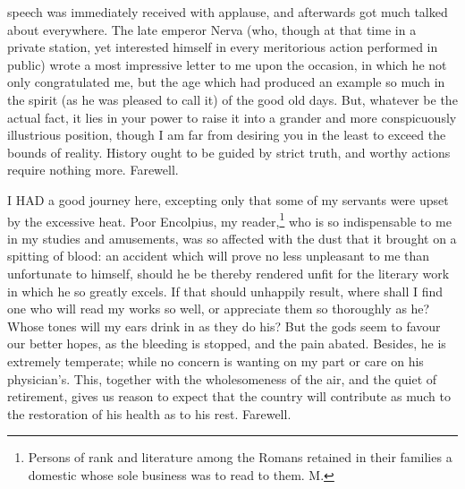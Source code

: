 speech was immediately received with applause, and afterwards got much
talked about everywhere. The late emperor Nerva (who, though at that time
in a private station, yet interested himself in every meritorious action
performed in public) wrote a most impressive letter to me upon the
occasion, in which he not only congratulated me, but the age which had
produced an example so much in the spirit (as he was pleased to call it)
of the good old days. But, whatever be the actual fact, it lies in your
power to raise it into a grander and more conspicuously illustrious
position, though I am far from desiring you in the least to exceed the
bounds of reality. History ought to be guided by strict truth, and worthy
actions require nothing more. Farewell.


I HAD a good journey here, excepting only that some of my servants were
upset by the excessive heat. Poor Encolpius, my reader,\footnote{Persons of rank and
literature among the Romans retained in their families a domestic whose
sole business was to read to them. M.}
who is so indispensable to me in my studies and amusements, was so
affected with the dust that it brought on a spitting of blood: an accident
which will prove no less unpleasant to me than unfortunate to himself,
should he be thereby rendered unfit for the literary work in which he so
greatly excels. If that should unhappily result, where shall I find one
who will read my works so well, or appreciate them so thoroughly as he?
Whose tones will my ears drink in as they do his? But the gods seem to
favour our better hopes, as the bleeding is stopped, and the pain abated.
Besides, he is extremely temperate; while no concern is wanting on my part
or care on his physician's. This, together with the wholesomeness of the
air, and the quiet of retirement, gives us reason to expect that the
country will contribute as much to the restoration of his health as to his
rest. Farewell.


